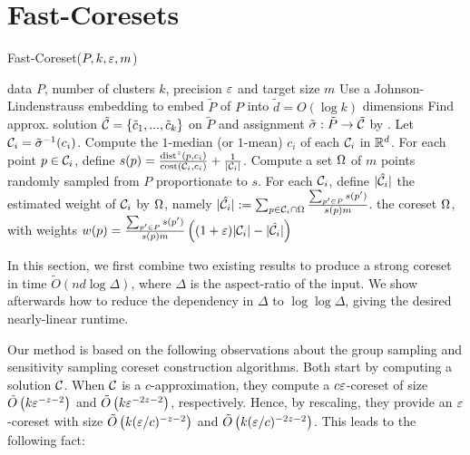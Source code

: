 \section{Fast-Coresets}
\label{sec:theory}

\begin{algorithm}[tb]
   \caption{Fast-Coreset($P, k, \varepsilon, m$)}
   \label{alg:main}
\begin{algorithmic}[1]
    data $P$, number of clusters $k$, precision $\varepsilon$ and target size $m$
   \State Use a Johnson-Lindenstrauss embedding to embed $\tilde P$ of $P$ into $\tilde d = O(\log k)$ dimensions
   \State Find approx. solution $\tilde {\mathcal C} = \left\{ \tilde c_1, ..., \tilde c_k\right\} $ on $\tilde P$ and assignment $\tilde \sigma : \tilde P \rightarrow
   \tilde {\mathcal C}$ by \fkmeans.	
   \State Let $\mathcal C_i = \tilde \sigma^{-1}(c_i)$. Compute the $1$-median (or $1$-mean) $c_i$ of each $\mathcal C_i$ in $\mathbb{R}^d$.%
   \State For each point $p \in \mathcal C_i$, define
   $s(p) = \frac{\operatorname{dist}^z(p, c_i)}{\operatorname{cost}(\mathcal C_i, c_i)}+ \frac{1}{|\mathcal C_i|}$.
   \State Compute a set $\Omega$ of $m$ points randomly sampled from $P$ proportionate to $s$.
   \State For each $\mathcal C_i$, define $|\hat {\mathcal C}_i|$ the estimated weight of $\mathcal C_i$ by $\Omega$, namely $|\hat {\mathcal C}_i| := \sum_{p \in \mathcal C_i \cap
   \Omega} \frac{\sum_{p' \in P}s(p')}{s(p)m}$.
    the coreset $\Omega$, with weights $w(p) = \frac{\sum_{p' \in P}s(p')}{s(p)m} \left( (1+\varepsilon)|\mathcal C_i| - |\hat {\mathcal C}_i|\right)$
\end{algorithmic}
\end{algorithm}


In this section, we first combine two existing results to produce a strong coreset in time $\tilde{O}(nd \log \Delta)$, where $\Delta$ is the aspect-ratio of
the input.  We show afterwards how to reduce the dependency in $\Delta$ to $\log \log \Delta$, giving the desired nearly-linear runtime.

Our method is based on the following observations about the group sampling \cite{stoc21} and sensitivity sampling \cite{FeldmanL11} coreset construction
algorithms. Both start by computing a solution $\mathcal C$. When $\mathcal C$ is a $c$-approximation, they compute a $c \varepsilon$-coreset of size $\tilde O\left(
k \varepsilon^{-z-2}\right)$ and $\tilde O\left( k \varepsilon^{-2z -2}\right)$, respectively. Hence, by rescaling, they provide an $\varepsilon$-coreset with size $\tilde O\left(
k (\varepsilon/c)^{-z-2}\right)$ and $\tilde O\left( k (\varepsilon/c)^{-2z-2}\right)$.  This leads to the following fact:

